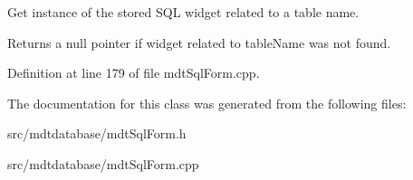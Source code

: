 Get instance of the stored SQL widget related to a table name. 

Returns a null pointer if widget related to tableName was not found. 

Definition at line 179 of file mdtSqlForm.cpp.



The documentation for this class was generated from the following files:\begin{DoxyCompactItemize}
\item 
src/mdtdatabase/mdtSqlForm.h\item 
src/mdtdatabase/mdtSqlForm.cpp\end{DoxyCompactItemize}
